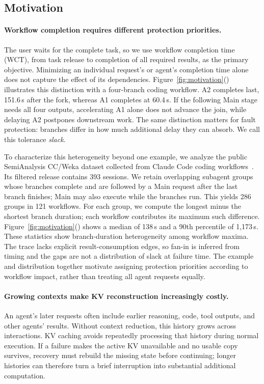 \subsection{Motivation}

\paragraph{Workflow completion requires different protection priorities.}
\label{sec:motivation-workflow}
The user waits for the complete task, so we use workflow completion time
(WCT), from task release to completion of all required results, as the
primary objective. Minimizing an individual request's or agent's completion
time alone does not capture the effect of its dependencies.
Figure~\ref{fig:motivation}() illustrates
this distinction with a four-branch coding workflow. A2 completes last,
151.6\,s after the fork, whereas A1 completes at 60.4\,s. If the following
Main stage needs all four outputs, accelerating A1 alone does not advance
the join, while delaying A2 postpones downstream work. The same distinction
matters for fault protection: branches differ in how much additional delay
they can absorb. We call this tolerance \emph{slack}.

To characterize this heterogeneity beyond one example, we analyze the
public SemiAnalysis CC/Weka dataset collected from Claude Code coding
workflows~\cite{semianalysis2026cctraces}. Its filtered release contains
393 sessions. We retain overlapping subagent groups whose branches
complete and are followed by a Main request after the last branch finishes;
Main may also execute while the branches run. This yields 286 groups in
121 workflows. For each group, we compute the longest minus the shortest
branch duration; each workflow contributes its maximum such difference.
Figure~\ref{fig:motivation}() shows a
median of 138\,s and a 90th percentile of 1,173\,s. These statistics show
branch-duration heterogeneity among workflow maxima. The trace lacks
explicit result-consumption edges, so fan-in is inferred from timing and
the gaps are not a distribution of slack at failure time. The example and
distribution together motivate assigning protection priorities according
to workflow impact, rather than treating all agent requests equally.

\paragraph{Growing contexts make KV reconstruction increasingly costly.}
\label{sec:motivation-long-context}
An agent's later requests often include earlier reasoning, code, tool
outputs, and other agents' results. Without context reduction, this history
grows across interactions. KV caching avoids repeatedly processing that
history during normal execution. If a failure makes the active KV
unavailable and no usable copy survives, recovery must rebuild the missing
state before continuing; longer histories can therefore turn a brief
interruption into substantial additional computation.

